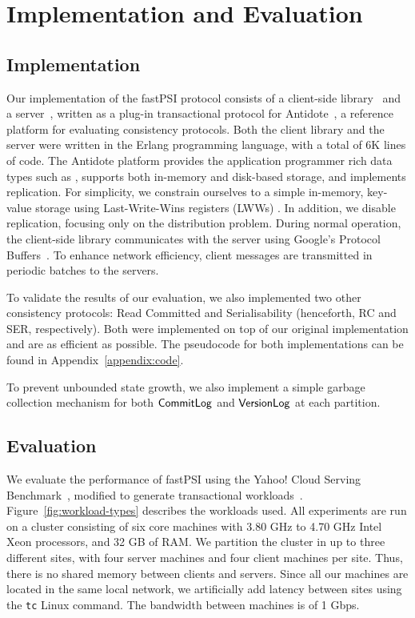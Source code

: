 \cleardoublepage
\chapter{Implementation and Evaluation}
\label{chapter:evaluation}

\section{Implementation}

Our implementation of the fastPSI protocol consists of a client-side library~\citep{pvc-client} and a server~\citep{pvc-server}, written as a plug-in transactional protocol for Antidote~\citep{antidote-db}, a reference platform for evaluating consistency protocols. Both the client library and the server were written in the Erlang programming language, with a total of 6K lines of code. The Antidote platform provides the application programmer rich data types such as , supports both in-memory and disk-based storage, and implements  replication. For simplicity, we constrain ourselves to a simple in-memory, key-value storage using Last-Write-Wins registers (LWWs) . In addition, we disable replication, focusing only on the distribution problem. During normal operation, the client-side library communicates with the server using Google's Protocol Buffers~\citep{protobuf}. To enhance network efficiency, client messages are transmitted in periodic batches to the servers. 

To validate the results of our evaluation, we also implemented two other consistency protocols: Read Committed and Serialisability (henceforth, RC and SER, respectively). Both were implemented on top of our original implementation and are as efficient as possible. The pseudocode for both implementations can be found in Appendix~\ref{appendix:code}.

To prevent unbounded state growth, we also implement a simple garbage collection mechanism for both $\mathsf{CommitLog}$ and $\mathsf{VersionLog}$ at each partition. 

\section{Evaluation}

We evaluate the performance of fastPSI using the Yahoo! Cloud Serving Benchmark~\citep{ycsb}, modified to generate transactional workloads~\citep{ardekani_nmsi, ardekani_gdur}. Figure~\ref{fig:workload-types} describes the workloads used. All experiments are run on a cluster consisting of six core machines with 3.80 GHz to 4.70 GHz Intel Xeon processors, and 32 GB of RAM. We partition the cluster in up to three different sites, with four server machines and four client machines per site. Thus, there is no shared memory between clients and servers. Since all our machines are located in the same local network, we artificially add latency between sites using the \texttt{tc} Linux command. The bandwidth between machines is of 1 Gbps.

